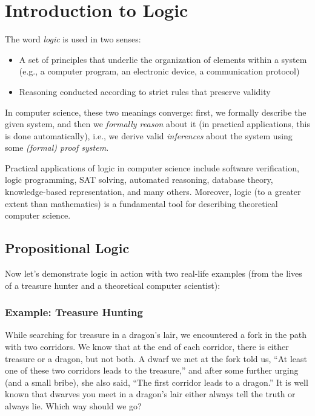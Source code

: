 \chapter{Introduction to Logic}

The word \emph{logic} is used in two senses:
\begin{itemize}
    \item A set of principles that underlie the organization of elements within a system (e.g., a computer program, an electronic device, a communication protocol)
    \item Reasoning conducted according to strict rules that preserve validity
\end{itemize}
In computer science, these two meanings converge: first, we formally describe the given system, and then we \emph{formally reason} about it (in practical applications, this is done automatically), i.e., we derive valid \emph{inferences} about the system using some \emph{(formal) proof system}.

Practical applications of logic in computer science include software verification, logic programming, SAT solving, automated reasoning, database theory, knowledge-based representation, and many others. Moreover, logic (to a greater extent than mathematics) is a fundamental tool for describing theoretical computer science.


\section{Propositional Logic}

Now let's demonstrate logic in action with two real-life examples (from the lives of a treasure hunter and a theoretical computer scientist):


\subsection{Example: Treasure Hunting}

\begin{tcolorbox}
\begin{example}
While searching for treasure in a dragon's lair, we encountered a fork in the path with two corridors. We know that at the end of each corridor, there is either treasure or a dragon, but not both. A dwarf we met at the fork told us, ``At least one of these two corridors leads to the treasure,'' and after some further urging (and a small bribe), she also said, ``The first corridor leads to a dragon.'' It is well known that dwarves you meet in a dragon's lair either always tell the truth or always lie. Which way should we go?
\end{example}
\end{tcolorbox}


